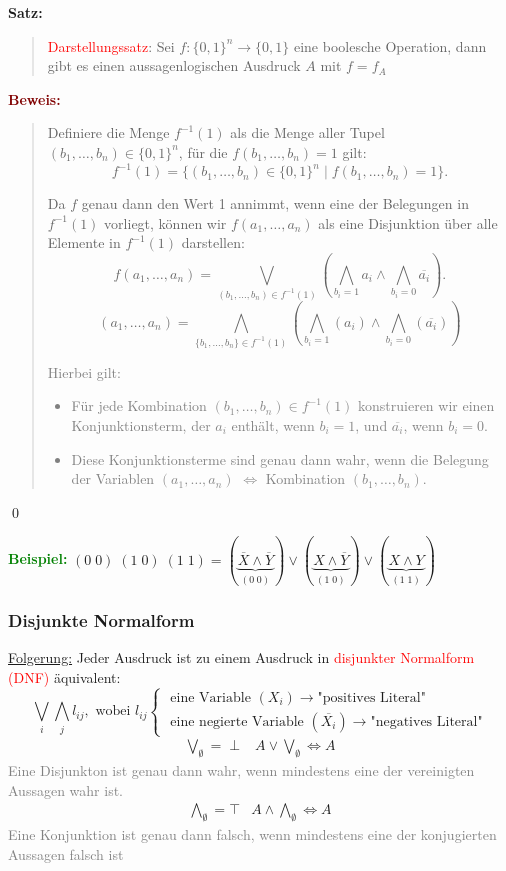 \documentclass{article}
\newcommand{\red}[1]{\textcolor{red}{#1}}
\newcommand{\gray}[1]{\textcolor{gray}{#1}}
\newcommand{\green}[1]{\textcolor{green}{#1}}
\newcommand{\dgr}[1]{\textcolor{dgr}{#1}}
\newcommand{\maroon}[1]{\textcolor{maroon}{#1}}
\newcommand{\ex}{\green{\textbf{Beispiel: }}}
\newcommand{\se}[1]{\dgr{\textbf{Satz: }}\begin{quote}#1\end{quote}}
\newcommand{\pr}[1]{\maroon{\textbf{Beweis: }}\begin{quote}#1\end{quote}\qed}
\newcommand{\n}[1]{\overline{#1}}
\begin{document}
\se{\red{Darstellungssatz}: Sei $f: \{0, 1\}^n \to \{0, 1\}$ eine boolesche Operation, dann gibt es einen aussagenlogischen Ausdruck $A$ mit $f = f_A$}
\pr{
    Definiere die Menge \( f^{-1}(1) \) als die Menge aller Tupel \( (b_1, \dots, b_n) \in \{0, 1\}^n \), für die \( f(b_1, \dots, b_n) = 1 \) gilt:
    \[
    f^{-1}(1) = \{(b_1, \dots, b_n) \in \{0, 1\}^n \mid f(b_1, \dots, b_n) = 1\}.
    \]

    Da \( f \) genau dann den Wert 1 annimmt, wenn eine der Belegungen in \( f^{-1}(1) \) vorliegt, können wir \( f(a_1, \dots, a_n) \) als eine Disjunktion über alle Elemente in \( f^{-1}(1) \) darstellen:
    \[
    f(a_1, \dots, a_n) = \bigvee_{(b_1, \dots, b_n) \in f^{-1}(1)} \left( \bigwedge_{b_i = 1} a_i \land \bigwedge_{b_i = 0} \n{a_i} \right).
    \]
    \[
    (a_1, \dots, a_n) = \bigwedge_{\{b_1, \dots, b_n\} \in f^{-1}(1)} (\bigwedge_{b_i = 1} (a_i) \land \bigwedge_{b_i = 0} (\n{a_i}))
    \]

    \gray{Hierbei gilt:
    \begin{itemize}
        \item Für jede Kombination \( (b_1, \dots, b_n) \in f^{-1}(1) \) konstruieren wir einen Konjunktionsterm, der \( a_i \) enthält, wenn \( b_i = 1 \), und \( \n{a_i} \), wenn \( b_i = 0 \).
        \item Diese Konjunktionsterme sind genau dann wahr, wenn die Belegung der Variablen \( (a_1, \dots, a_n) \) $\iff$ Kombination \( (b_1, \dots, b_n) \).
    \end{itemize}}
}

\newpage
\ex $(0 \; 0) \; (1 \; 0) \; (1 \; 1) = (\underbrace{\n{X} \land \n{Y}}_{(0 \; 0)}) \lor (\underbrace{X \land \n{Y}}_{(1 \; 0)}) \lor (\underbrace{X \land Y}_{(1 \; 1)})$

\subsubsection{Disjunkte Normalform}

\underline{Folgerung:} Jeder Ausdruck ist zu einem Ausdruck in \red{disjunkter Normalform (DNF)} äquivalent:
\[
    \bigvee_i \bigwedge_j l_{ij}, \text{ wobei } l_{ij} \begin{cases}
        \text{ eine Variable } (X_i) \to \text{"positives Literal"}\\
        \text{ eine negierte Variable } (\n{X_i}) \to \text{"negatives Literal"}
    \end{cases}
\]
\[
    \begin{array}{lcl}
        \bigvee_{\emptyset} = \perp & A \lor \bigvee_{\emptyset} \iff A
    \end{array}        
\]
\gray{Eine Disjunkton ist genau dann wahr, wenn mindestens eine der vereinigten Aussagen wahr ist.}
\[
    \begin{array}{lcl}
        \bigwedge_{\emptyset} = \top & A \land \bigwedge_{\emptyset} \iff A
    \end{array}
\]
\gray{Eine Konjunktion ist genau dann falsch, wenn mindestens eine der konjugierten Aussagen falsch ist}
\end{document}
